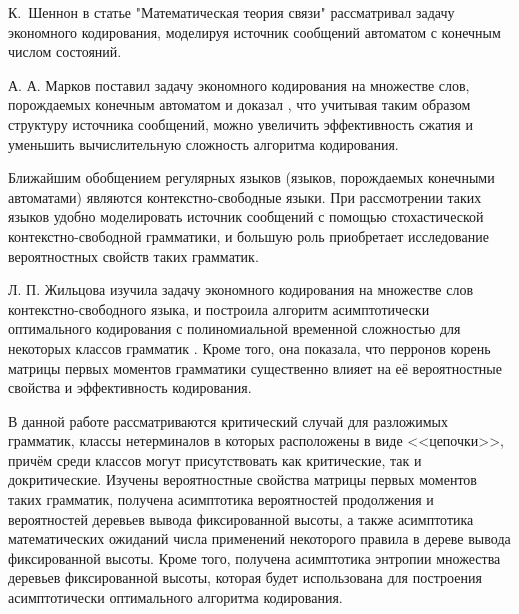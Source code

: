 \documentclass[12pt]{article}
\begin{document}
К.~Шеннон в статье "Математическая теория связи" \cite{shennon-mts} рассматривал задачу экономного кодирования, моделируя источник сообщений автоматом с конечным числом состояний.

А. А. Марков поставил задачу экономного кодирования на множестве слов, порождаемых конечным автоматом и доказал \cite{markov-coding}, что учитывая таким образом структуру источника сообщений, можно увеличить эффективность сжатия и уменьшить вычислительную сложность алгоритма кодирования.

Ближайшим обобщением регулярных языков (языков, порождаемых конечными автоматами) являются контекстно-свободные языки. При рассмотрении таких языков удобно моделировать источник сообщений с помощью стохастической контекстно-свободной грамматики, и большую роль приобретает исследование вероятностных свойств таких грамматик.

Л. П. Жильцова изучила задачу экономного кодирования на множестве слов контекстно-свободного языка, и построила алгоритм асимптотически оптимального кодирования с полиномиальной временной сложностью для некоторых классов грамматик \cite{zhiltsova-zakonom} \cite{zhiltsova-cost}. Кроме того, она показала, что перронов корень \cite{gantmaher-matrix-theory} матрицы первых моментов \cite{sevast-processes} грамматики существенно влияет на её вероятностные свойства и эффективность кодирования.


В данной работе рассматриваются критический случай для разложимых грамматик, классы нетерминалов в которых расположены в виде <<цепочки>>, причём среди классов могут присутствовать как критические, так и докритические. Изучены вероятностные свойства матрицы первых моментов таких грамматик, получена асимптотика вероятностей продолжения и вероятностей деревьев вывода фиксированной высоты, а также асимптотика математических ожиданий числа применений некоторого правила в дереве вывода фиксированной высоты. Кроме того, получена асимптотика энтропии множества деревьев фиксированной высоты, которая будет использована для построения асимптотически оптимального алгоритма кодирования.
\end{document}
